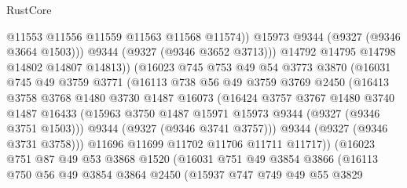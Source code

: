 \begin{lexlean}{RustCore}
\begin{coremodule}
                            @11553
                            @11556
                            @11559
                            @11563
                            @11568
                            @11574))
                        @15973
                        @9344
                        (@9327 (@9346 @3664 @1503)))
                      @9344
                      (@9327 (@9346 @3652 @3713)))
                    @14792
                    @14795
                    @14798
                    @14802
                    @14807
                    @14813))
                (@16023
                  @745
                  @753
                  @49
                  @54
                  @3773
                  @3870
                  (@16031
                    @745
                    @49
                    @3759
                    @3771
                    (@16113
                      @738
                      @56
                      @49
                      @3759
                      @3769
                      @2450
                      (@16413
                        @3758
                        @3768
                        @1480
                        @3730
                        @1487
                        @16073
                        (@16424
                          @3757
                          @3767
                          @1480
                          @3740
                          @1487
                          @16433
                          (@15963 @3750 @1487 @15971 @15973 @9344 (@9327 (@9346 @3751 @1503)))
                          @9344
                          (@9327 (@9346 @3741 @3757)))
                        @9344
                        (@9327 (@9346 @3731 @3758)))
                      @11696
                      @11699
                      @11702
                      @11706
                      @11711
                      @11717))
                  (@16023
                    @751
                    @87
                    @49
                    @53
                    @3868
                    @1520
                    (@16031
                      @751
                      @49
                      @3854
                      @3866
                      (@16113
                        @750
                        @56
                        @49
                        @3854
                        @3864
                        @2450
                        (@15937
                          @747
                          @749
                          @49
                          @55
                          @3829

\end{coremodule}
\end{lexlean}
